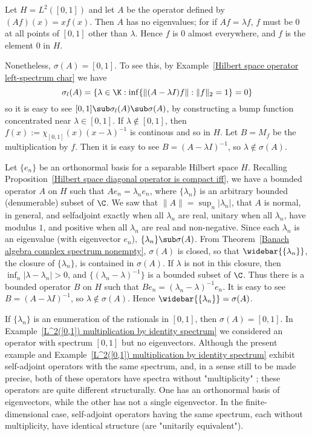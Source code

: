 \begin{example}\label{L^2([0,1]) multiplication by identity spectrum}
Let $H=L^2([0,1])$ and let $A$ be the operator defined by $(Af)(x)=xf(x)$. Then $A$ has no eigenvalues; for if $Af=\lambda f$, $f$ must be $0$ at all points of $[0,1]$ other than $\lambda$. Hence $f$ is $0$ almost everywhere, and $f$ is the element $0$ in $H$.\par
Nonetheless, $\sigma(A)=[0,1]$. To see this, by Example~\ref{Hilbert space operator left-spectrum char} we have
\[\sigma_l(A)=\{\lambda\in\K:\inf\{\|(A-\lambda I)f\|:\|f\|_2=1\}=0\}\]
so it is easy to see $[0,1]\sub\sigma_l(A)\sub\sigma(A)$, by constructing a bump function concentrated near $\lambda\in[0,1]$. If $\lambda\notin[0,1]$, then $f(x):=\chi_{[0,1]}(x)(x-\lambda)^{-1}$ is continous and so in $H$. Let $B=M_f$ be the multiplication by $f$. Then it is easy to see $B=(A-\lambda I)^{-1}$, so $\lambda\notin\sigma(A)$.
\end{example}
\begin{example}
Let $\{e_n\}$ be an orthonormal basis for a separable Hilbert space $H$. Recalling Proposition~\ref{Hilbert space diagonal operator is compact iff}, we have a bounded operator $A$ on $H$ such that $Ae_n=\lambda_ne_n$, where $\{\lambda_n\}$ is an arbitrary bounded (denumerable) subset of $\C$. We saw that $\|A\|=\sup_n|\lambda_n|$, that $A$ is normal, in general, and selfadjoint exactly when all $\lambda_n$ are real, unitary when all $\lambda_n$, have modulus $1$, and positive when all $\lambda_n$ are real and non-negative. Since each $\lambda_n$ is an eigenvalue (with eigenvector $e_n$), $\{\lambda_n\}\sub\sigma(A)$. From Theorem~\ref{Banach algebra complex spectrum nonempty}, $\sigma(A)$ is closed, so that $\widebar{\{\lambda_n\}}$, the closure of $\{\lambda_n\}$, is contained in $\sigma(A)$. If $\lambda$ is not in this closure, then $\inf_n|\lambda-\lambda_n|>0$, and $\{(\lambda_n-\lambda)^{-1}\}$ is a bounded subset of $\C$. Thus there is a bounded operator $B$ on $H$ such that $Be_n=(\lambda_n-\lambda)^{-1}e_n$. It is easy to see $B=(A-\lambda I)^{-1}$, so $\lambda\notin\sigma(A)$. Hence $\widebar{\{\lambda_n\}}=\sigma(A)$.\par
If $\{\lambda_n\}$ is an enumeration of the rationals in $[0,1]$, then $\sigma(A)=[0,1]$. In Example~\ref{L^2([0,1]) multiplication by identity spectrum} we considered an operator with spectrum $[0,1]$ but no eigenvectors. Although the present example and Example~\ref{L^2([0,1]) multiplication by identity spectrum} exhibit self-adjoint operators with the same spectrum, and, in a sense still to be made precise, both of these operators have spectra without "multiplicity" ; these operators are quite different structurally. One has an orthonormal basis of eigenvectors, while the other has not a single eigenvector. In the finite-dimensional case, self-adjoint operators having the same spectrum, each without multiplicity, have identical structure (are "unitarily equivalent").
\end{example}
